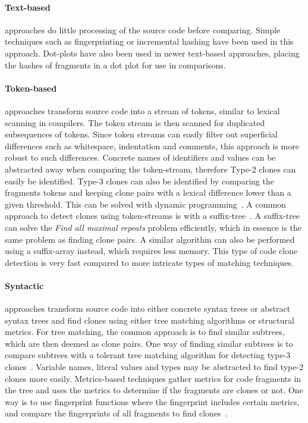 \paragraph{Text-based} approaches do little processing of the source code before
comparing. Simple techniques such as fingerprinting or incremental hashing have been used
in this approach. Dot-plots have also been used in newer text-based approaches, placing
the hashes of fragments in a dot plot for use in comparisons.

\paragraph{Token-based} approaches transform source code into a stream of tokens, similar
to lexical scanning in compilers. The token stream is then scanned for duplicated
subsequences of tokens. Since token streams can easily filter out superficial differences
such as whitespace, indentation and comments, this approach is more robust to such
differences. Concrete names of identifiers and values can be abstracted away when
comparing the token-stream, therefore Type-2 clones can easily be identified. Type-3
clones can also be identified by comparing the fragments tokens and keeping clone pairs
with a lexical difference lower than a given threshold. This can be solved with dynamic
programming~\cite{BakerSparseDynamicProgramming}. A common approach to detect clones using
token-streams is with a suffix-tree~\cite{Zibran_real_time_search}. A suffix-tree can solve
the \textit{Find all maximal repeats} problem efficiently, which in essence is the same
problem as finding clone pairs. A similar algorithm can also be performed using a suffix-array
instead, which requires less memory. This type of code clone detection is very fast
compared to more intricate types of matching techniques.

\paragraph{Syntactic} approaches transform source code into either concrete syntax trees
or abstract syntax trees and find clones using either tree matching algorithms or
structural metrics. For tree matching, the common approach is to find similar subtrees,
which are then deemed as clone pairs. One way of finding similar subtrees is to compare
subtrees with a tolerant tree matching algorithm for detecting type-3
clones~\cite{ASTCloneDetection}. Variable names, literal values and types may be
abstracted to find type-2 clones more easily. Metrics-based techniques gather metrics for
code fragments in the tree and uses the metrics to determine if the fragments are clones
or not. One way is to use fingerprint functions where the fingerprint includes certain
metrics, and compare the fingerprints of all fragments to find clones~\cite{Deckard}.

